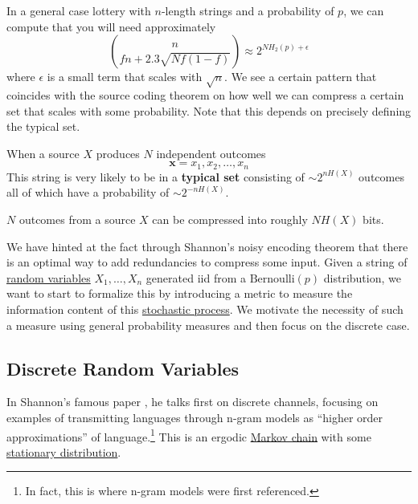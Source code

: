   In a general case lottery with $n$-length strings and a probability of $p$, we can compute that you will need approximately 
  \begin{equation}
    \binom{n}{f n + 2.3 \sqrt{N f (1 - f)}} \approx 2^{N H_2 (p) + \epsilon} 
  \end{equation}
  where $\epsilon$ is a small term that scales with $\sqrt{n}$. We see a certain pattern that coincides with the source coding theorem on how well we can compress a certain set that scales with some probability. Note that this depends on precisely defining the typical set. 

  \begin{definition}
    \label{def:typical-set}
    When a source $X$ produces $N$ independent outcomes 
    \begin{equation}
      \mathbf{x} = x_1, x_2, \ldots, x_n
    \end{equation}
    This string is very likely to be in a \textbf{typical set} consisting of $\sim 2^{n H(X)}$ outcomes all of which have a probability of $\sim 2^{-n H(X)}$. 
  \end{definition}

  \begin{theorem}
    \label{thm:source-coding-theorem}
    $N$ outcomes from a source $X$ can be compressed into roughly $N H(X)$ bits. 
  \end{theorem}


  We have hinted at the fact through Shannon's noisy encoding theorem that there is an optimal way to add redundancies to compress some input. Given a string of \hyperref[prob-def:random-variable]{random variables} $X_1, \ldots, X_n$ generated iid from a $\mathrm{Bernoulli}(p)$ distribution, we want to start to formalize this by introducing a metric to measure the information content of this \hyperref[sp-def:stochastic-process]{stochastic process}. We motivate the necessity of such a measure using general probability measures and then focus on the discrete case. 

  \subsection{Discrete Random Variables}

    In Shannon's famous paper \cite{shannon}, he talks first on discrete channels, focusing on examples of transmitting languages through n-gram models as ``higher order approximations'' of language.\footnote{In fact, this is where n-gram models were first referenced.} This is an ergodic \hyperref[sp-def:markov-chain]{Markov chain} with some \hyperref[sp-def:stationary-distribution]{stationary distribution}. 


